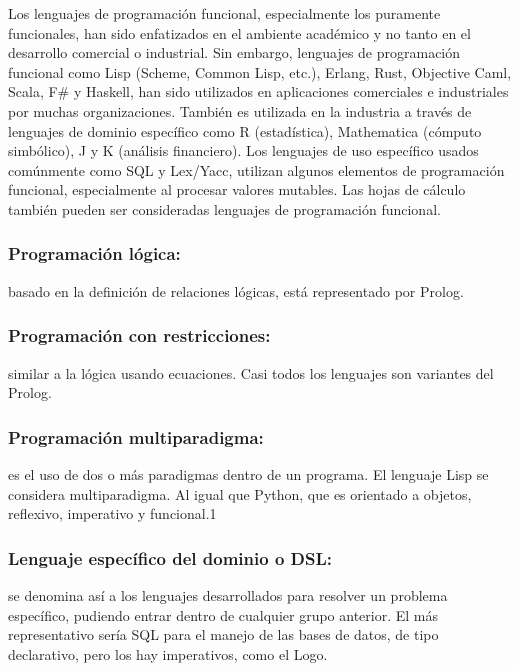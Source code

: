 \documentclass[11pt]{article}
\begin{document}
Los lenguajes de programación funcional, especialmente los puramente
funcionales, han sido enfatizados en el ambiente académico y no tanto
en el desarrollo comercial o industrial. Sin embargo, lenguajes de
programación funcional como Lisp (Scheme, Common Lisp, etc.), Erlang,
Rust, Objective Caml, Scala, F\# y Haskell, han sido utilizados en
aplicaciones comerciales e industriales por muchas
organizaciones. También es utilizada en la industria a través de
lenguajes de dominio específico como R (estadística), Mathematica
(cómputo simbólico), J y K (análisis financiero). Los lenguajes de uso
específico usados comúnmente como SQL y Lex/Yacc, utilizan algunos
elementos de programación funcional, especialmente al procesar valores
mutables. Las hojas de cálculo también pueden ser consideradas
lenguajes de programación funcional.

\subsubsection*{Programación lógica:}
\label{sec:orgfcb870a}
basado en la definición de relaciones lógicas,
 está representado por Prolog.


\subsubsection*{Programación con restricciones:}
\label{sec:orgc52a58e}
similar a la lógica usando
 ecuaciones. Casi todos los lenguajes son variantes del Prolog.

\subsubsection*{Programación multiparadigma:}
\label{sec:org54ecf70}
es el uso de dos o más paradigmas dentro
  de un programa. El lenguaje Lisp se considera multiparadigma. Al
  igual que Python, que es orientado a objetos, reflexivo, imperativo y
  funcional.1

\subsubsection*{Lenguaje específico del dominio o DSL:}
\label{sec:org1899031}
se denomina así a los
  lenguajes desarrollados para resolver un problema específico,
  pudiendo entrar dentro de cualquier grupo anterior. El más
  representativo sería SQL para el manejo de las bases de datos, de
  tipo declarativo, pero los hay imperativos, como el Logo.
\end{document}
